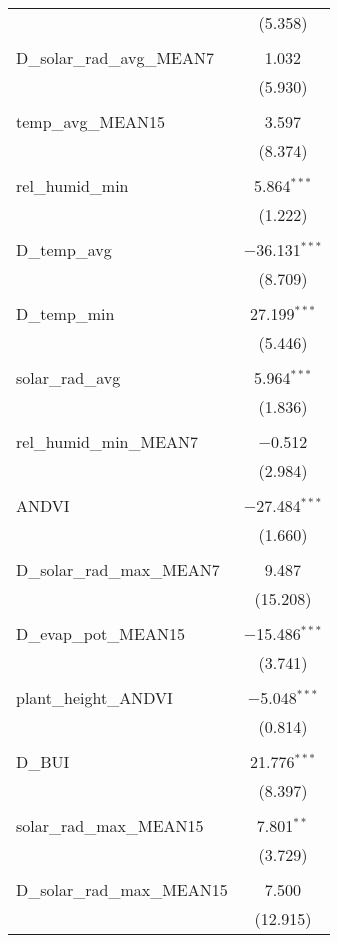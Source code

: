 \begin{table}[!htbp]
\begin{tabular}{@{\extracolsep{5pt}}lc}
  & (5.358) \\ 
  & \\ 
 D\_solar\_rad\_avg\_MEAN7 & 1.032 \\ 
  & (5.930) \\ 
  & \\ 
 temp\_avg\_MEAN15 & 3.597 \\ 
  & (8.374) \\ 
  & \\ 
 rel\_humid\_min & 5.864$^{***}$ \\ 
  & (1.222) \\ 
  & \\ 
 D\_temp\_avg & $-$36.131$^{***}$ \\ 
  & (8.709) \\ 
  & \\ 
 D\_temp\_min & 27.199$^{***}$ \\ 
  & (5.446) \\ 
  & \\ 
 solar\_rad\_avg & 5.964$^{***}$ \\ 
  & (1.836) \\ 
  & \\ 
 rel\_humid\_min\_MEAN7 & $-$0.512 \\ 
  & (2.984) \\ 
  & \\ 
 ANDVI & $-$27.484$^{***}$ \\ 
  & (1.660) \\ 
  & \\ 
 D\_solar\_rad\_max\_MEAN7 & 9.487 \\ 
  & (15.208) \\ 
  & \\ 
 D\_evap\_pot\_MEAN15 & $-$15.486$^{***}$ \\ 
  & (3.741) \\ 
  & \\ 
 plant\_height\_ANDVI & $-$5.048$^{***}$ \\ 
  & (0.814) \\ 
  & \\ 
 D\_BUI & 21.776$^{***}$ \\ 
  & (8.397) \\ 
  & \\ 
 solar\_rad\_max\_MEAN15 & 7.801$^{**}$ \\ 
  & (3.729) \\ 
  & \\ 
 D\_solar\_rad\_max\_MEAN15 & 7.500 \\ 
  & (12.915) \\ 

\end{tabular}
\end{table}
